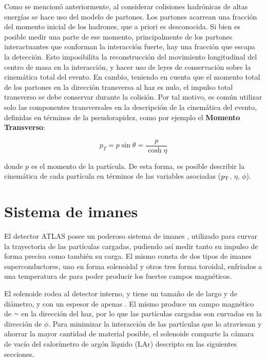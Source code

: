 
Como se mencionó anteriormente, al considerar colisiones hadrónicas de altas energías se hace uso del modelo de partones. Los partones acarrean una fracción del momento inicial de los hadrones, que a priori es desconocida. Si bien es posible medir una parte de ese momento, principalmente de los partones interactuantes que conforman la interacción fuerte, hay una fracción que escapa la detección. Esto imposibilita la reconstrucción del movimiento longitudinal del centro de masa en la interacción, y hacer uso de leyes de conservación sobre la cinemática total del evento. En cambio, teniendo en cuenta que el momento total de los partones en la dirección transversa al haz es nulo, el impulso total transverso se debe conservar durante la colisión. Por tal motivo, es común utilizar solo las componentes transversales en la descripción de la cinemática del evento, definidas en términos de la pseudorapidez, como por ejemplo el \textbf{Momento Transverso}:

\begin{equation}
p_{T}=p\sin\theta=\frac{p}{\cosh{\eta}}
\end{equation}

\noindent
donde $p$ es el momento de la partícula. De esta forma, es posible describir la cinemática de cada partícula en términos de las variables asociadas ($p_{\text{T}}$, $\eta$, $\phi$).

\section{Sistema de imanes}

El detector ATLAS posee un poderoso sistema de imanes \cite{magnet}, utilizado para curvar la trayectoria de las partículas cargadas, pudiendo así medir tanto su impulso de forma precisa como también su carga. El mismo consta de dos tipos de imanes superconductores, uno en forma solenoidal y otros tres forma toroidal, enfriados a una temperatura de  para poder producir los fuertes campos magnéticos.

El solenoide rodea al detector interno, y tiene un tamaño de  de largo y  de diámetro, 
y con un espesor de apenas . El mismo produce un campo magnético de {$\smallsim$} en la dirección del haz, por lo que las partículas cargadas son curvadas en la dirección de $\phi$. Para minimizar la interacción de las partículas que lo atraviesan y ahorrar la mayor cantidad de material posible, el solenoide comparte la cámara de vacío del calorímetro de argón líquido (LAr) descripto en las siguientes secciones.

